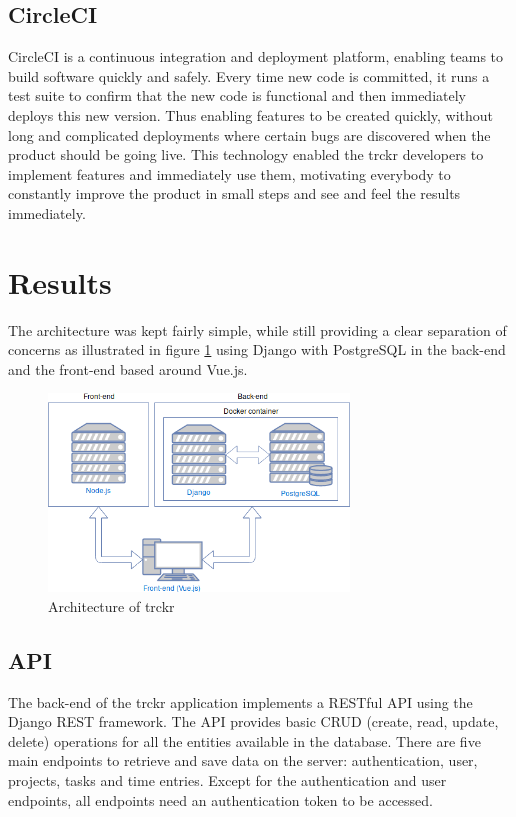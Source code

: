\documentclass[bibliography=totoc, listof=totocnumbered]{scrartcl}
\begin{document}
\subsection{CircleCI}
CircleCI is a continuous integration and deployment platform, enabling teams to
build software quickly and safely. Every time new code is committed, it runs a
test suite to confirm that the new code is functional and then immediately
deploys this new version. Thus enabling features to be created quickly, without
long and complicated deployments where certain bugs are discovered when the
product should be going live. This technology enabled the trckr developers to
implement features and immediately use them, motivating everybody to constantly
improve the product in small steps and see and feel the results immediately.

\section{Results}
The architecture was kept fairly simple, while still providing a clear
separation of concerns as illustrated in figure \ref{fig:architecture} using
Django with PostgreSQL in the back-end and the front-end based around Vue.js.

\begin{figure}[h]
    \includegraphics[width=8cm]{architecture}
    \caption{Architecture of trckr}
    \label{fig:architecture}
\end{figure}

\subsection{API}
The back-end of the trckr application implements a RESTful API using the Django
REST framework. The API provides basic CRUD (create, read, update, delete)
operations for all the entities available in the database. There are five main
endpoints to retrieve and save data on the server: authentication, user, 
projects, tasks and time entries. Except for the authentication and user
endpoints, all endpoints need an authentication token to be accessed.
\end{document}
